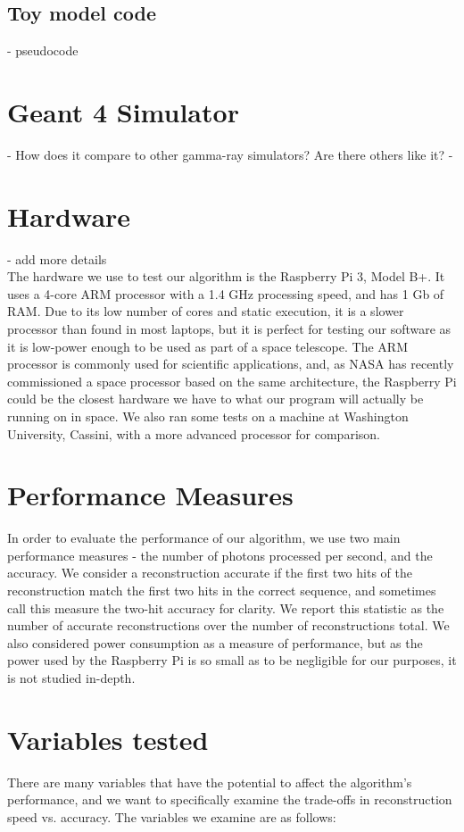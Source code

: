 \subsection{Toy model code}
- pseudocode

\section{Geant 4 Simulator}
- How does it compare to other gamma-ray simulators? Are there others like it?
- 

\section{Hardware} - add more details\\
The hardware we use to test our algorithm is the Raspberry Pi 3, Model B+. It uses a 4-core ARM processor with a 1.4 GHz processing speed, and has 1 Gb of RAM. Due to its low number of cores and static execution, it is a slower processor than found in most laptops, but it is perfect for testing our software as it is low-power enough to be used as part of a space telescope. The ARM processor is commonly used for scientific applications, and, as NASA has recently commissioned a space processor based on the same architecture, the Raspberry Pi could be the closest hardware we have to what our program will actually be running on in space. We also ran some tests on a machine at Washington University, Cassini, with a more advanced processor for comparison.

\section{Performance Measures}
In order to evaluate the performance of our algorithm, we use two main performance measures - the number of photons processed per second, and the accuracy. We consider a reconstruction accurate if the first two hits of the reconstruction match the first two hits in the correct sequence, and sometimes call this measure the two-hit accuracy for clarity. We report this statistic as the number of accurate reconstructions over the number of reconstructions total. We also considered power consumption as a measure of performance, but as the power used by the Raspberry Pi is so small as to be negligible for our purposes, it is not studied in-depth.

\section{Variables tested}
There are many variables that have the potential to affect the algorithm's performance, and we want to specifically examine the trade-offs in reconstruction speed vs. accuracy. The variables we examine are as follows:


